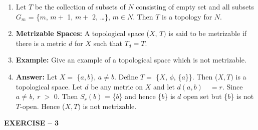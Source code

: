 \documentclass[12pt]{amsart}
\begin{document}
\begin{enumerate}
\item Let $T$ be the collection of subsets of $N$ consisting of empty set and all subsets $G_{m}$ = {\{}$m$, $m +$ 1, $m +$ 2, {\ldots}{\}}, $m\in N$. Then $T$ is a topology for $N$.
\item \textbf{Metrizable Spaces:} A topological space ($X$, $T)$ is said to be metrizable if there is a metric $d$ for $X$ such that $T_{d}=T$.
\item \textbf{Example:} Give an example of a topological space which is not metrizable.
\item \textbf{Answer:} Let $X =$ {\{}$a, b${\}}, $a\ne b$. Define $T =$ {\{}$X$, $\phi $, {\{}$a${\}}{\}}. Then ($X, T)$ is a topological space. Let $d$ be any metric on $X$ and let $d(a, b) \quad = r$. Since $a\ne $\textit{b, r $>$ }0. Then $S_{r}(b)$ = {\{}$b${\}} and hence {\{}$b${\}} is $d$ open set but {\{}$b${\}} is not $T$-open. Hence ($X, T)$ is not metrizable.
\end{enumerate}

\textbf{EXERCISE -- 3}
\end{document}
